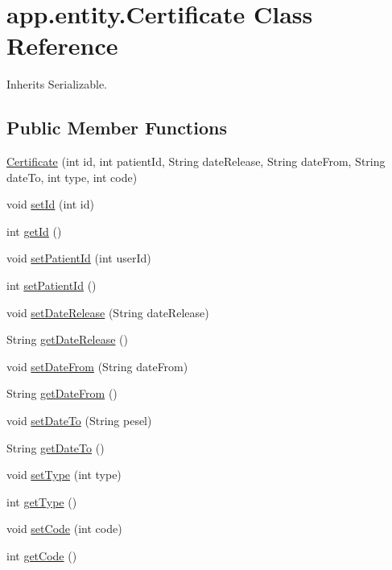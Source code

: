 \hypertarget{classapp_1_1entity_1_1_certificate}{}\section{app.\+entity.\+Certificate Class Reference}
\label{classapp_1_1entity_1_1_certificate}


Inherits Serializable.

\subsection*{Public Member Functions}
\begin{DoxyCompactItemize}
\item 
\mbox{\hyperlink{classapp_1_1entity_1_1_certificate_a9e97e9364f3c16874f2a1335ef86b00e}{Certificate}} (int id, int patient\+Id, String date\+Release, String date\+From, String date\+To, int type, int code)
\item 
void \mbox{\hyperlink{classapp_1_1entity_1_1_certificate_a17bdfc9e4693f1590de09ee6ddda1bda}{set\+Id}} (int id)
\item 
int \mbox{\hyperlink{classapp_1_1entity_1_1_certificate_af76963568bb97cad0cc10189ad969c6c}{get\+Id}} ()
\item 
void \mbox{\hyperlink{classapp_1_1entity_1_1_certificate_ad2cb00c865b1570b1b7876c1862e242f}{set\+Patient\+Id}} (int user\+Id)
\item 
int \mbox{\hyperlink{classapp_1_1entity_1_1_certificate_a89211cfa9672944116ef046c07d9d0ad}{set\+Patient\+Id}} ()
\item 
void \mbox{\hyperlink{classapp_1_1entity_1_1_certificate_aa85e6e56d712342f68aa9af96342d085}{set\+Date\+Release}} (String date\+Release)
\item 
String \mbox{\hyperlink{classapp_1_1entity_1_1_certificate_a9e5d450b2becbd4475f10354635e46d2}{get\+Date\+Release}} ()
\item 
void \mbox{\hyperlink{classapp_1_1entity_1_1_certificate_a4bc54ac2ef765f5673a4552c094e9288}{set\+Date\+From}} (String date\+From)
\item 
String \mbox{\hyperlink{classapp_1_1entity_1_1_certificate_ad3a854d7829e9ae8b5239d162e08631e}{get\+Date\+From}} ()
\item 
void \mbox{\hyperlink{classapp_1_1entity_1_1_certificate_ac779576209ad884b893ef051fea3d1ac}{set\+Date\+To}} (String pesel)
\item 
String \mbox{\hyperlink{classapp_1_1entity_1_1_certificate_a743634419f37915339bed55fb72bdf8e}{get\+Date\+To}} ()
\item 
void \mbox{\hyperlink{classapp_1_1entity_1_1_certificate_a1b99e541f40ffaac1d3e7ce345074af9}{set\+Type}} (int type)
\item 
int \mbox{\hyperlink{classapp_1_1entity_1_1_certificate_ab4f5de3b6c9d8d4d5548b22b3d4a8ee1}{get\+Type}} ()
\item 
void \mbox{\hyperlink{classapp_1_1entity_1_1_certificate_a65ff6696033329d19248030cfb6112b1}{set\+Code}} (int code)
\item 
int \mbox{\hyperlink{classapp_1_1entity_1_1_certificate_aa796c1d89bc5066469a3bfa2cd477b15}{get\+Code}} ()
\end{DoxyCompactItemize}


